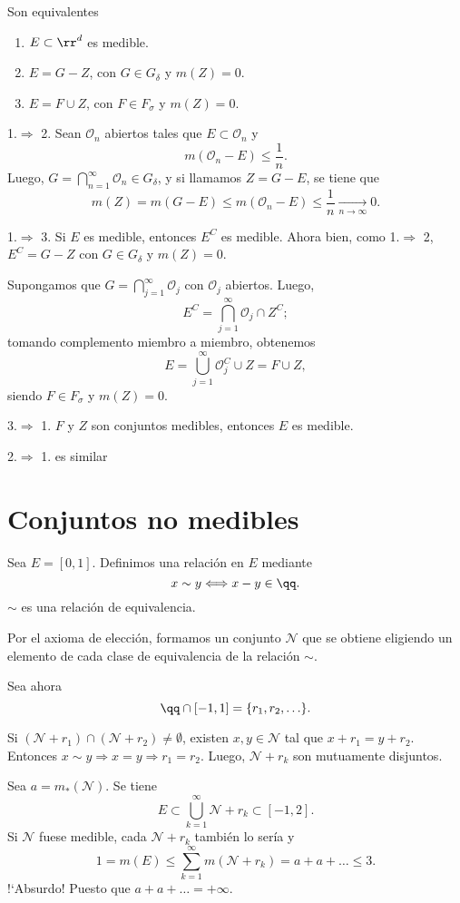 \begin{teorema}{}
Son equivalentes
\begin{enumerate}
    \item $E\subset \rr^d$ es medible.
    \item $E=G-Z$, con $G\in G_{\delta}$ y $m(Z)=0$.
    \item $E=F\cup Z$, con $F \in F_{\sigma}$ y $m(Z)=0$.
\end{enumerate}
\end{teorema}

\begin{demo}{}
1.$\Rightarrow$ 2.
Sean $\mathcal{O}_n$ abiertos tales que $E\subset \mathcal{O}_n$ y 
\[
m(\mathcal{O}_n-E)\leq \frac{1}{n}.
\]
Luego, $G=\bigcap\limits_{n=1}^{\infty} \mathcal{O}_n \in G_{\delta}$, 
y si llamamos $Z=G-E$, se tiene que 
\[m(Z)=
m(G-E)\leq m(\mathcal{O}_n-E)\leq \frac{1}{n}\xrightarrow[n \to \infty]{}0.
\]

1.$\Rightarrow$ 3.
Si $E$ es medible, entonces $E^C$ es medible. Ahora bien, como 1.$\Rightarrow$ 2, $E^C=G-Z$ con $G \in G_{\delta}$  y $m(Z)=0$. 

Supongamos que $G=\bigcap\limits_{j=1}^{\infty} \mathcal{O}_j$ 
con $\mathcal{O}_j$ abiertos.
Luego, 
\[E^C=\bigcap\limits_{j=1}^{\infty} \mathcal{O}_j \cap Z^C;
\]
tomando complemento miembro a miembro, obtenemos
\[
E=\bigcup\limits_{j=1}^{\infty} \mathcal{O}_j^C \cup Z=F\cup Z,
\]
siendo $F \in F_{\sigma}$ y $m(Z)=0$.

3.$\Rightarrow$ 1. $F$ y $Z$ son conjuntos medibles, entonces $E$ es medible.

2.$\Rightarrow$ 1. es similar

\end{demo}


\section{Conjuntos no medibles}

Sea $E=[0,1]$. 
Definimos una relaci\'on en $E$ mediante
\[
x \sim y \Longleftrightarrow  x-y\in \qq.
\]
$\sim$ es una relaci\'on de equivalencia.

Por el axioma de elecci\'on, formamos un  conjunto $\mathcal{N}$ que se obtiene eligiendo  un elemento de cada clase de equivalencia de la relaci\'on $\sim$.

Sea ahora 
\[
\qq \cap [-1,1] 
=\{r_1,r_2,\ldots \}.
\] 

Si $(\mathcal{N}+r_1)\cap (\mathcal{N}+r_2)\neq \emptyset$, 
existen $x,y\in \mathcal{N}$ tal que $x+r_1=y+r_2$. Entonces 
$x \sim y \Rightarrow x=y \Rightarrow r_1=r_2$.
Luego, $\mathcal{N}+r_k$ son mutuamente disjuntos.

Sea $a=m_{*}(\mathcal{N})$. 
Se tiene  
\[
E\subset \bigcup\limits_{k=1}^{\infty} \mathcal{N}+r_k
\subset [-1,2]. 
\]
Si $\mathcal{N}$ fuese medible, cada $\mathcal{N}+r_k$ tambi\'en lo ser\'ia y 
\[
1=m(E)\leq \sum\limits_{k=1}^{\infty}m(\mathcal{N}+r_k)=a+a+\ldots\leq 3. 
\]
!`Absurdo! Puesto que $a+a+\ldots=+\infty$.
